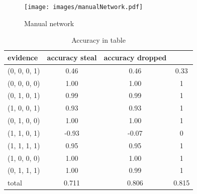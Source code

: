 \documentclass[12pt]{article}
\begin{document}
 \begin{figure}[htbp]
\begin{center}
\texttt{[image: images/manualNetwork.pdf]}
\caption{Manual network}
\label{ }
\end{center}
\end{figure}

\begin{table}[htbp]
\begin{center}
\begin{tabular}{|l|c|c|c|}
\hline
evidence & accuracy steal & accuracy dropped & \\
\hline
(0, 0, 0, 1) & 0.46 & 0.46 & 0.33 \\
(0, 0, 0, 0) & 1.00 & 1.00 &  1\\
(0, 1, 0, 1) & 0.99 & 0.99 &  1\\
(1, 0, 0, 1) & 0.93 & 0.93 &  1\\
(0, 1, 0, 0) & 1.00 & 1.00 &  1\\
(1, 1, 0, 1) & -0.93 & -0.07 &  0\\
(1, 1, 1, 1) & 0.95 & 0.95 &  1\\
(1, 0, 0, 0) & 1.00 & 1.00 &  1\\
(0, 1, 1, 1) & 1.00 & 0.99 &  1\\
\hline
total & 0.711 &  0.806 & 0.815 \\
\hline
\end{tabular}
\end{center}
\caption{ Accuracy in table}
\label{now}
\end{table}
\end{document}
